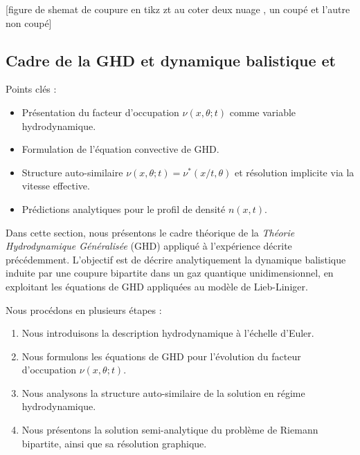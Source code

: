 \begin{center}
	[figure de shemat de coupure en tikz zt au coter deux nuage , un coupé et l'autre non coupé]	
\end{center}





\subsection{Cadre de la GHD et dynamique balistique et }
\label{sec.GHDpredictions}\label{sec:ghd}\label{chap6:sec:ghd}

{\color{blue}
Points clés :
\begin{itemize}
	\item Présentation du facteur d’occupation $\nu(x,\theta;t)$ comme variable hydrodynamique.
	\item Formulation de l’équation convective de GHD.
	\item Structure auto-similaire $\nu(x,\theta;t) = \nu^*(x/t,\theta)$ et résolution implicite via la vitesse effective.
	\item Prédictions analytiques pour le profil de densité $n(x,t)$.
\end{itemize}
}


Dans cette section, nous présentons le cadre théorique de la \emph{Théorie Hydrodynamique Généralisée} (GHD) appliqué à l’expérience décrite précédemment. L’objectif est de décrire analytiquement la dynamique balistique induite par une coupure bipartite dans un gaz quantique unidimensionnel, en exploitant les équations de GHD appliquées au modèle de Lieb-Liniger.\\

{\color{blue}
Nous procédons en plusieurs étapes : 
\begin{enumerate}
  \item Nous introduisons la description hydrodynamique à l’échelle d’Euler.
  \item Nous formulons les équations de GHD pour l’évolution du facteur d’occupation $\nu(x,\theta;t)$.
  \item Nous analysons la structure auto-similaire de la solution en régime hydrodynamique.
  \item Nous présentons la solution semi-analytique du problème de Riemann bipartite, ainsi que sa résolution graphique.
\end{enumerate}
}

